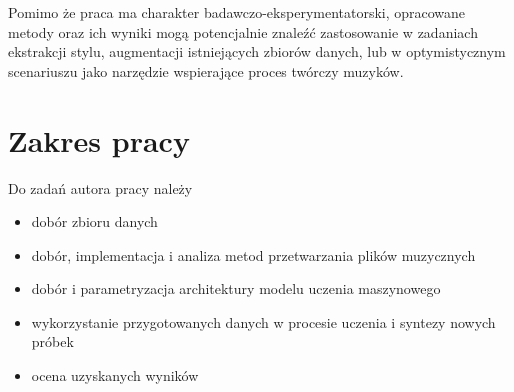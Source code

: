 {{        Pomimo że praca ma charakter badawczo-eksperymentatorski, 
        opracowane metody oraz ich wyniki mogą potencjalnie znaleźć zastosowanie
        w zadaniach ekstrakcji stylu, augmentacji istniejących zbiorów danych,
        lub w optymistycznym scenariuszu jako narzędzie wspierające proces twórczy muzyków.
    }

    \section{Zakres pracy}
    {
        Do zadań autora pracy należy
        \begin{itemize}
            \item dobór zbioru danych
            \item dobór, implementacja i analiza metod przetwarzania plików muzycznych
            \item dobór i parametryzacja architektury modelu uczenia maszynowego
            \item wykorzystanie przygotowanych danych 
            w procesie uczenia i syntezy nowych próbek
            \item ocena uzyskanych wyników
        \end{itemize}
    }





}
